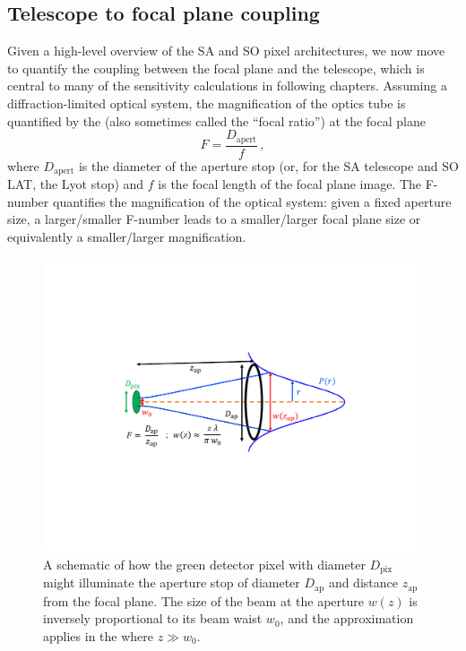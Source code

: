 \subsection{Telescope to focal plane coupling}
\label{sec:beam_coupling}

Given a high-level overview of the SA and SO pixel architectures, we now move to quantify the coupling between the focal plane and the telescope, which is central to many of the sensitivity calculations in following chapters. Assuming a diffraction-limited optical system, the magnification of the optics tube is quantified by the  (also sometimes called the ``focal ratio'') at the focal plane
\begin{equation}
    F = \frac{D_{\mathrm{apert}}}{f} \, ,
    \label{eq:fnumber}
\end{equation}
where $D_{\mathrm{apert}}$ is the diameter of the aperture stop (or, for the SA telescope and SO LAT, the Lyot stop) and $f$ is the focal length of the focal plane image. The F-number quantifies the magnification of the optical system: given a fixed aperture size, a larger/smaller F-number leads to a smaller/larger focal plane size or equivalently a smaller/larger magnification.

\begin{figure}
    \centering
    \includegraphics[width=\linewidth, trim=5cm 7cm 5cm 7cm, clip]{InstrumentOverview/Figures/beam_coupling_efficiency.pdf}
    \caption{A schematic of how the green detector pixel with diameter $D_{\mathrm{pix}}$ might illuminate the aperture stop of diameter $D_{\mathrm{ap}}$ and distance $z_{\mathrm{ap}}$ from the focal plane. The size of the beam at the aperture $w(z)$ is inversely proportional to its beam waist $w_{0}$, and the approximation applies in the  where $z \gg w_{0}$.}
    \label{fig:beam_coupling_efficiency}
\end{figure}

